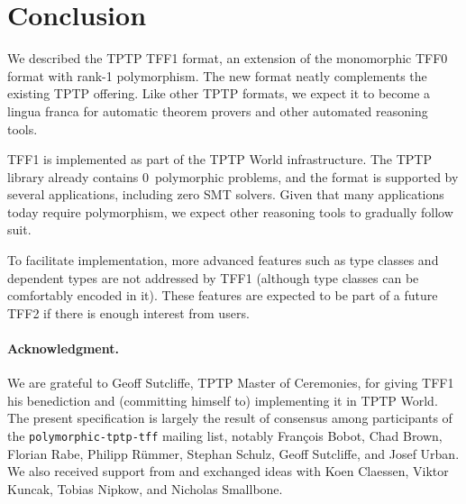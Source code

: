 \section{Conclusion}
\label{sec_concl}

We described the TPTP TFF1 format, an extension of the monomorphic TFF0 format
with rank-1 polymorphism. The new format neatly complements the existing TPTP
offering. Like other TPTP formats, we expect it to become a lingua franca for
automatic theorem provers and other automated reasoning tools.

TFF1 is implemented as part of the TPTP World infrastructure. The TPTP library
already contains 0~polymorphic problems, and the format is supported by several
applications, including zero SMT solvers. Given that many applications today
require polymorphism, we expect other reasoning tools to gradually follow suit.

To facilitate implementation, more advanced features such as type classes and
dependent types are not addressed by TFF1 (although type classes can be
comfortably encoded in it). These features are expected to be part of a future
TFF2 if there is enough interest from users.

\def\ackname{Acknowledgment}
\paragraph{\textbf{\upshape\ackname.}}
%
We are grateful to Geoff Sutcliffe, TPTP Master of Ceremonies, for giving TFF1
his benediction and (committing himself to) implementing it in TPTP World. The
present specification is largely the result of consensus among participants of
the {\tt polymorphic-tptp-tff} mailing list, notably Fran\c{c}ois Bobot, Chad
Brown, Florian Rabe, Philipp R\"ummer, Stephan Schulz, Geoff Sutcliffe, and
Josef Urban. We also received support from and exchanged ideas with Koen
Claessen, Viktor Kuncak, Tobias Nipkow, and Nicholas Smallbone.

